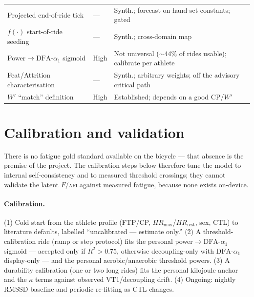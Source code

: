 \documentclass[11pt]{article}
\newcommand{\afi}{\textup{\textsc{afi}}}
\newcommand{\aone}{\ensuremath{\text{DFA-}\alpha_1}}
\newcommand{\Fstate}{\ensuremath{F}}
\begin{document}
\begin{table}[h]
\begin{tabularx}{\linewidth}{@{}l l X@{}}
Projected end-of-ride tick & --- & Synth.; forecast on hand-set constants; gated \\
$f(\cdot)$ start-of-ride seeding & --- & Synth.; cross-domain map \\
Power$\rightarrow$$\aone$ sigmoid & High & Not universal ($\sim$44\% of rides usable); calibrate per athlete \\
Feat/Attrition characterisation & --- & Synth.; arbitrary weights; off the advisory critical path \\
$W'$ ``match'' definition & High & Established; depends on a good CP/$W'$ \\
\bottomrule
\end{tabularx}
\end{table}

\section{Calibration and validation}\label{sec:validation}

There is no fatigue gold standard available on the bicycle --- that absence is the premise of the project. The calibration steps below therefore tune the model to internal self-consistency and to measured threshold crossings; they cannot validate the latent $\Fstate$/\afi{} against measured fatigue, because none exists on-device.

\paragraph{Calibration.} (1) Cold start from the athlete profile (FTP/CP, $HR_{\max}$/$HR_{\text{rest}}$, sex, CTL) to literature defaults, labelled ``uncalibrated --- estimate only.'' (2) A threshold-calibration ride (ramp or step protocol) fits the personal power$\rightarrow$$\aone$ sigmoid --- accepted only if $R^2>0.75$, otherwise decoupling-only with $\aone$ display-only --- and the personal aerobic/anaerobic threshold powers. (3) A durability calibration (one or two long rides) fits the personal kilojoule anchor and the $\kappa$ terms against observed VT1/decoupling drift. (4) Ongoing: nightly RMSSD baseline and periodic re-fitting as CTL changes.
\end{document}
